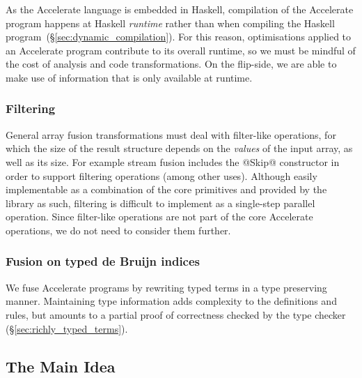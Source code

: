 As the Accelerate language is embedded in Haskell, compilation of the Accelerate
program happens at Haskell \emph{runtime} rather than when compiling the Haskell
program~(\S\ref{sec:dynamic_compilation}). For this reason, optimisations
applied to an Accelerate program contribute to its overall runtime, so we must
be mindful of the cost of analysis and code transformations. On the flip-side,
we are able to make use of information that is only available at runtime.

\subsubsection{Filtering}

General array fusion transformations must deal with filter-like operations, for
which the size of the result structure depends on the \emph{values} of the input
array, as well as its size. For example stream fusion
includes the @Skip@ constructor in order to support filtering operations (among
other uses). Although easily implementable as a combination of the core
primitives and provided by the library as such, filtering is difficult to
implement as a single-step parallel operation. Since filter-like operations are
not part of the core Accelerate operations, we do not need to consider them
further.

%

\subsubsection{Fusion on typed de Bruijn indices}

We fuse Accelerate programs by rewriting typed  terms in a
type preserving manner. Maintaining type information adds complexity to the
definitions and rules, but amounts to a partial proof of correctness checked by
the type checker (\S\ref{sec:richly_typed_terms}).


\subsection{The Main Idea}
\label{sec:the_main_idea}

